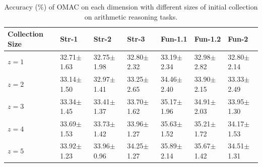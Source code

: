 

\begin{table}[th]\footnotesize
  \centering
  \begin{threeparttable}
    \captionsetup{width=\textwidth}
    \caption{Accuracy (\%) of OMAC on each dimension with different sizes of initial collection on arithmetic reasoning tasks.}
    \label{tab:set_size}


    \begin{minipage}{0.95\textwidth}
    \begin{tabular}{%
        p{2.2cm}<{\centering}
        p{1.4cm}<{\centering}
        p{1.4cm}<{\centering}
        p{1.4cm}<{\centering}
        p{1.4cm}<{\centering}
        p{1.4cm}<{\centering}
        p{1.4cm}<{\centering}}
      \toprule
      Collection Size & Str-1\scriptsize & Str-2\scriptsize & Str-3\scriptsize
      & Fun-1.1\scriptsize & Fun-1.2\scriptsize & Fun-2 \\
      \midrule
    $z=1$
        & 32.71\tiny{$\pm$1.63} & 32.75\tiny{$\pm$1.98}
        & 32.80\tiny{$\pm$2.32} & 33.19\tiny{$\pm$2.34}
        & 32.98\tiny{$\pm$2.82} & 32.80\tiny{$\pm$2.14} \\
    $z=2$
        & 33.14\tiny{$\pm$1.50} & 32.97\tiny{$\pm$1.41}
        & 33.25\tiny{$\pm$2.65} & 34.46\tiny{$\pm$2.40}
        & 33.90\tiny{$\pm$2.15} & 33.33\tiny{$\pm$2.49} \\
    $z=3$
        & {33.34}\tiny{$\pm$1.45} & {33.41}\tiny{$\pm$1.37}
        & {33.70}\tiny{$\pm$1.62} & {35.17}\tiny{$\pm$1.96}
        & {34.91}\tiny{$\pm$2.03} & {33.95}\tiny{$\pm$1.30} \\
    $z=4$
        & 33.69\tiny{$\pm$1.53} & 33.73\tiny{$\pm$1.42}
        & 33.96\tiny{$\pm$1.27} & 35.63\tiny{$\pm$1.52}
        & 35.21\tiny{$\pm$1.72} & 34.17\tiny{$\pm$1.53} \\
    $z=5$
        & 33.92\tiny{$\pm$1.23} & 33.96\tiny{$\pm$0.96}
        & 34.25\tiny{$\pm$1.27} & 35.89\tiny{$\pm$2.14}
        & 35.67\tiny{$\pm$1.42} & 34.51\tiny{$\pm$1.31} \\
      \bottomrule
    \end{tabular}
    \end{minipage}

  \end{threeparttable}
\end{table}